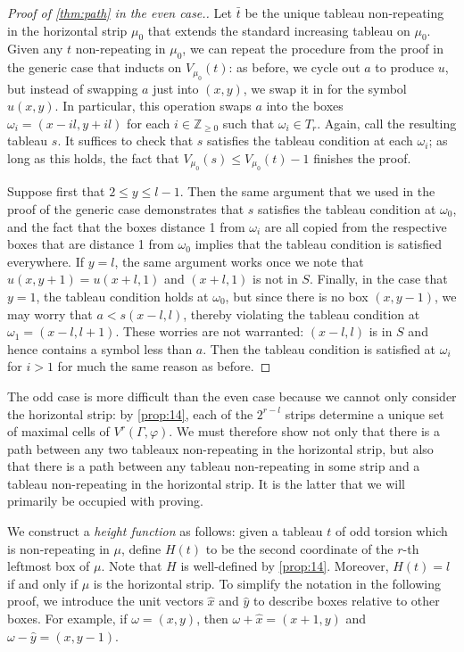 \documentclass[11pt,reqno]{amsart}
\newcommand*{\Z}{\mathbb{Z}}
\theoremstyle{definition}
\theoremstyle{problem}
\theoremstyle{plain}
\theoremstyle{remark}
\theoremstyle{theorem}
\numberwithin{equation}{section}
\numberwithin{figure}{section}
\begin{document}
\begin{proof}[Proof of \cref{thm:path} in the even case.]
  Let $\bar{t}$ be the unique tableau non-repeating in the horizontal
  strip $\mu_0$ that extends the standard increasing tableau on
  $\mu_0$.  Given any $t$ non-repeating in $\mu_0$, we can repeat the
  procedure from the proof in the generic case that inducts on
  $V_{\mu_0}(t)$: as before, we cycle out $a$ to produce $u$, but
  instead of swapping $a$ just into $(x,y)$, we swap it in for the
  symbol $u(x,y)$.  In particular, this operation swaps $a$ into the
  boxes $\omega_i = (x-il,y+il)$ for each $i \in \Z_{\geq 0}$ such
  that $\omega_i \in T_r$.  Again, call the resulting tableau $s$.  It
  suffices to check that $s$ satisfies the tableau condition at each
  $\omega_i$; as long as this holds, the fact that
  $V_{\mu_0}(s) \leq V_{\mu_0}(t) - 1$ finishes the proof.

  Suppose first that $2 \leq y \leq l-1$.  Then the same argument that
  we used in the proof of the generic case demonstrates that $s$
  satisfies the tableau condition at $\omega_0$, and the fact that the
  boxes distance 1 from $\omega_i$ are all copied from the respective
  boxes that are distance 1 from $\omega_0$ implies that the tableau
  condition is satisfied everywhere.  If $y = l$, the same argument
  works once we note that $u(x,y+1) = u(x+l,1)$ and $(x+l,1)$ is not
  in $S$.  Finally, in the case that $y = 1$, the tableau condition
  holds at $\omega_0$, but since there is no box $(x,y-1)$, we may
  worry that $a < s(x-l,l)$, thereby violating the tableau condition
  at $\omega_1 = (x-l,l+1)$.  These worries are not warranted:
  $(x-l,l)$ is in $S$ and hence contains a symbol less than $a$.  Then
  the tableau condition is satisfied at $\omega_i$ for $i > 1$ for
  much the same reason as before.
\end{proof}

The odd case is more difficult than the even case because we cannot
only consider the horizontal strip: by \cref{prop:14}, each of the
$2^{r-l}$ strips determine a unique set of maximal cells of
$V^r(\Gamma,\varphi)$.  We must therefore show not only that there is
a path between any two tableaux non-repeating in the horizontal strip,
but also that there is a path between any tableau non-repeating in some
strip and a tableau non-repeating in the horizontal strip.  It is the
latter that we will primarily be occupied with proving.

We construct a \textit{height function} as follows: given a tableau
$t$ of odd torsion which is non-repeating in $\mu$, define $H(t)$ to
be the second coordinate of the $r$-th leftmost box of $\mu$.  Note
that $H$ is well-defined by \cref{prop:14}.  Moreover, $H(t) = l$ if
and only if $\mu$ is the horizontal strip. 
To simplify the notation in the following proof, we introduce the unit
vectors $\hat x$ and $\hat y$ to describe boxes relative to other
boxes.  For example, if $\omega = (x,y)$, then
$\omega + \hat x = (x+1,y)$ and $\omega - \hat y = (x,y-1)$.
\end{document}
